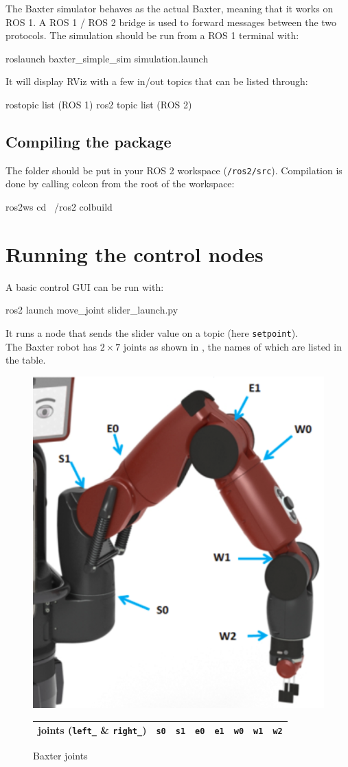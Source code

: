 \documentclass{ecnreport}
\begin{document}
The Baxter simulator behaves as the actual Baxter, meaning that it works on ROS 1. A ROS 1 / ROS 2 bridge is used to forward messages between the two protocols.
The simulation should be run from a ROS 1 terminal with:
\begin{bashcodelarge}
roslaunch baxter_simple_sim simulation.launch
\end{bashcodelarge}

It will display RViz with a few in/out topics that can be listed through:
\begin{bashcodelarge}
rostopic list (ROS 1)
ros2 topic list (ROS 2)
\end{bashcodelarge}

\subsection{Compiling the package}

The folder should be put in your ROS 2 workspace (\texttt{\texttilde/ros2/src}). Compilation is done by calling colcon from the root of the workspace:
\begin{bashcodelarge}
 ros2ws
 cd ~/ros2
 colbuild
\end{bashcodelarge}

\section{Running the control nodes}

A basic control GUI can be run with:

\begin{bashcodelarge}
 ros2 launch move_joint slider_launch.py
\end{bashcodelarge}
It runs a node that sends the slider value on a topic (here \texttt{setpoint}).\\

The Baxter robot has $2\times 7$ joints as shown in , the names of which are listed in the table.
\begin{figure}[h]\centering
 \includegraphics[width=.3\linewidth]{baxter} \\
  \begin{tabular}{|c|c|c|c|c|c|c|c|}
  \hline
  joints (\texttt{left\_} \& \texttt{right\_})& \texttt{s0} & \texttt{s1}& \texttt{e0} & \texttt{e1} & \texttt{w0} & \texttt{w1} & \texttt{w2} \\\hline
 \end{tabular}
 \caption{Baxter joints}
 \label{baxter}
\end{figure}
\end{document}
